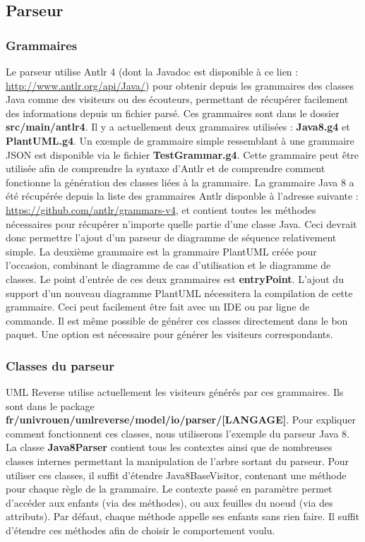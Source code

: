 \documentclass[hidelinks, 10pt,a4paper]{article}
\begin{document}
  
  \subsection{Parseur}
  \subsubsection{Grammaires}
  Le parseur utilise Antlr 4 (dont la Javadoc est disponible à ce lien : \\
  \hyperref[http://www.antlr.org/api/Java/]{http://www.antlr.org/api/Java/}) pour obtenir depuis les grammaires des classes Java comme des visiteurs ou des écouteurs, permettant de récupérer facilement des informations depuis un fichier parsé. Ces grammaires sont dans le dossier \textbf{src/main/antlr4}. Il y a actuellement deux grammaires utilisées : \textbf{Java8.g4} et \textbf{PlantUML.g4}. Un exemple de grammaire simple ressemblant à une grammaire JSON est disponible via le fichier \textbf{TestGrammar.g4}. Cette grammaire peut être utilisée afin de comprendre la syntaxe d'Antlr et de comprendre comment fonctionne la génération des classes liées à la grammaire. La grammaire Java 8 a été récupérée depuis la liste des grammaires Antlr disponble à l'adresse suivante : \\
  \hyperref[https://github.com/antlr/grammars-v4]{https://github.com/antlr/grammars-v4}, et contient toutes les méthodes nécessaires pour récupérer n'importe quelle partie d'une classe Java. Ceci devrait donc permettre l'ajout d'un parseur de diagramme de séquence relativement simple. La deuxième grammaire est la grammaire PlantUML créée pour l'occasion, combinant le diagramme de cas d'utilisation et le diagramme de classes. Le point d'entrée de ces deux grammaires est \textbf{entryPoint}. L'ajout du support d'un nouveau diagramme PlantUML nécessitera la compilation de cette grammaire. Ceci peut facilement être fait avec un IDE ou par ligne de commande. Il est même possible de générer ces classes directement dans le bon paquet. Une option est nécessaire pour générer les visiteurs correspondants.
  \subsubsection{Classes du parseur}
  UML Reverse utilise actuellement les visiteurs générés par ces grammaires. Ils sont dans le package \textbf{fr/univrouen/umlreverse/model/io/parser/[LANGAGE]}. Pour expliquer comment fonctionnent ces classes, nous utiliserons l'exemple du parseur Java 8. La classe \textbf{Java8Parser} contient tous les contextes ainsi que de nombreuses classes internes permettant la manipulation de l'arbre sortant du parseur. Pour utiliser ces classes, il suffit d'étendre Java8BaseVisitor, contenant une méthode pour chaque règle de la grammaire. Le contexte passé en paramètre permet d'accéder aux enfants (via des méthodes), ou aux feuilles du noeud (via des attributs). Par défaut, chaque méthode appelle ses enfants sans rien faire. Il suffit d'étendre ces méthodes afin de choisir le comportement voulu.
\end{document}

